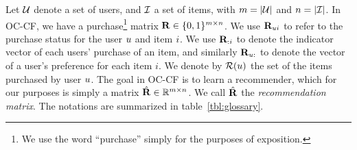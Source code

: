 
Let $\mathcal{U}$ denote a set of users, and $\mathcal{I}$ a set of items,
with $m = | \mathcal{U} |$ and $n = | \mathcal{I} |$.
In OC-CF, we have a purchase\footnote{We use the word ``purchase'' simply for the purposes of exposition.}
matrix $\mathbf{R} \in \{ 0, 1 \}^{m \times n}$. %
We use $\mathbf{R}_{ui}$ to refer to the purchase status for the user $u$ and item $i$.
We use $\mathbf{R}_{:i}$ to denote the indicator vector of each users' purchase of an item, and similarly $\mathbf{R}_{u:}$ to denote the vector of a user's preference for each item $i$.
We denote by  $\mathcal{R}(u)$ the set of the items purchased by user $u$. The goal in OC-CF is to learn a recommender, which for our purposes is simply a matrix $\hat{\mathbf{R}} \in \mathbb{R}^{m \times n}$. %
We call $\hat{\mathbf{R}}$ the \emph{recommendation matrix}. The notations are summarized in table~\ref{tbl:glossary}.

\begin{table}[t]
	\centering
	\caption{Commonly used symbols.}
	\label{tbl:glossary}
\end{table}


